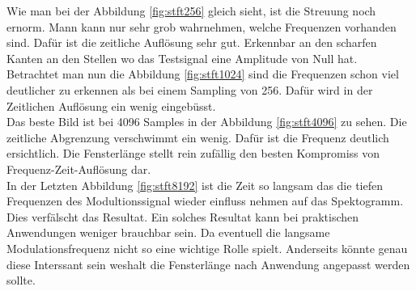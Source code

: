 Wie man bei der Abbildung \ref{fig:stft256} gleich sieht, ist die Streuung noch ernorm. Mann kann nur sehr grob wahrnehmen, welche Frequenzen vorhanden sind. Dafür ist die zeitliche Auflösung sehr gut. Erkennbar an den scharfen Kanten an den Stellen wo das Testsignal eine Amplitude von Null hat. \\

Betrachtet man nun die Abbildung \ref{fig:stft1024} sind die Frequenzen schon viel deutlicher zu erkennen als bei einem Sampling von 256. Dafür wird in der Zeitlichen Auflösung ein wenig eingebüsst.\\

Das beste Bild ist bei 4096 Samples in der Abbildung \ref{fig:stft4096} zu sehen. Die zeitliche Abgrenzung verschwimmt ein wenig. Dafür ist die Frequenz deutlich ersichtlich. Die Fensterlänge stellt rein zufällig den besten Kompromiss von Frequenz-Zeit-Auflösung dar.\\

In der Letzten Abbildung \ref{fig:stft8192} ist die Zeit so langsam das die tiefen Frequenzen des Modultionssignal wieder einfluss nehmen auf das Spektogramm. Dies verfälscht das Resultat. Ein solches Resultat kann bei praktischen Anwendungen weniger brauchbar sein. Da eventuell die  langsame Modulationsfrequenz nicht so eine wichtige Rolle spielt. Anderseits könnte genau diese Interssant sein weshalt die Fensterlänge nach Anwendung angepasst werden sollte.\\
\newpage





